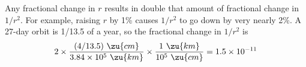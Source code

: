 Any fractional change in $r$ results in double that
amount of fractional change in $1/r^2$. For example, raising
$r$ by 1\% causes $1/r^2$ to go down by very nearly 2\%. 
A 27-day orbit is 1/13.5 of a year, so
the fractional change in $1/r^2$ is
\begin{equation*}
 2 \times \frac{(4/13.5)\ \zu{cm}}{3.84\times10^5\ \zu{km}} 
   \times \frac{1\ \zu{km}}{10^5\ \zu{cm}}
 = 1.5\times10^{-11}
\end{equation*}
